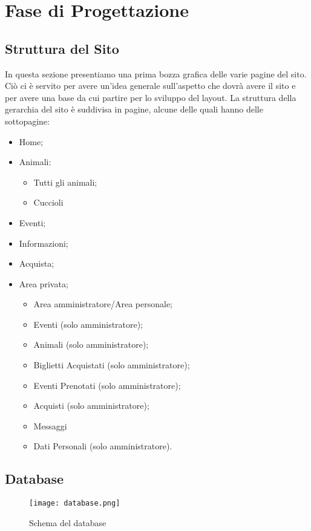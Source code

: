 \section{Fase di Progettazione}
    \subsection{Struttura del Sito}
    In questa sezione presentiamo una prima bozza grafica delle varie pagine del sito. Ciò ci è servito per avere un'idea generale sull'aspetto che dovrà avere il sito e per avere una base da cui partire per lo sviluppo del layout.
    La struttura della gerarchia del sito è  suddivisa in pagine, alcune delle quali hanno delle sottopagine:
    \begin{itemize}
        \item Home;
        \item Animali:
            \begin{itemize}
                \item Tutti gli animali;
                \item Cuccioli
            \end{itemize}
        \item Eventi;
        \item Informazioni;
        \item Acquista;
        \item Area privata;
            \begin{itemize}
                \item Area amministratore/Area personale;
                \item Eventi (solo amministratore);
                \item Animali (solo amministratore);
                \item Biglietti Acquistati (solo amministratore);
                \item Eventi Prenotati (solo amministratore);
                \item Acquisti (solo amministratore);
                \item Messaggi
                \item Dati Personali (solo amministratore).
            \end{itemize}
    \end{itemize}
    \subsection{Database}
        \begin{figure}[H]
            \centering
            \texttt{[image: database.png]}
            \caption{Schema del database}  \label{fig:xray}
        \end{figure}
\pagebreak